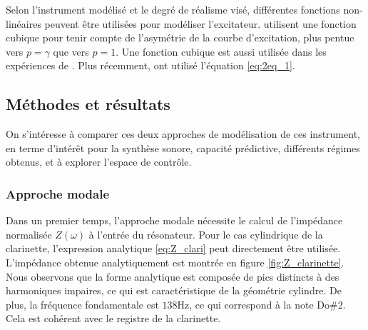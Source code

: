 Selon l'instrument modélisé et le degré de réalisme visé, différentes fonctions non-linéaires peuvent être utilisées pour modéliser l'excitateur. \cite{mcintyre_oscillations_1983} utilisent une fonction cubique pour tenir compte de l'asymétrie de la courbe d'excitation, plus pentue vers $p=\gamma$ que vers $p=1$. Une fonction cubique est aussi utilisée dans les expériences de \cite{maganza_bifurcations_1986}. Plus récemment, \cite{taillardIteratedMapsClarinetlike2010} ont utilisé l'équation \eqref{eq:2eq_1}.





\subsection{Méthodes et résultats}

On s'intéresse à comparer ces deux approches de modélisation de ces instrument, en terme d'intérêt pour la synthèse sonore, capacité prédictive, différents régimes obtenus, et à explorer l'espace de contrôle. 

\subsubsection{Approche modale}\label{sec:result_modal}

Dans un premier temps, l'approche modale nécessite le calcul de l'impédance normalisée $Z(\omega)$ à l'entrée du résonateur. Pour le cas cylindrique de la clarinette, l'expression analytique \eqref{eq:Z_clari} peut directement être utilisée. L'impédance obtenue analytiquement est montrée en figure \ref{fig:Z_clarinette}. Nous observons que la forme analytique est composée de pics distincts à des harmoniques impaires, ce qui est caractéristique de la géométrie cylindre. De plus, la fréquence fondamentale est $138$Hz, ce qui correspond à la note Do\#2. Cela est cohérent avec le registre de la clarinette.


